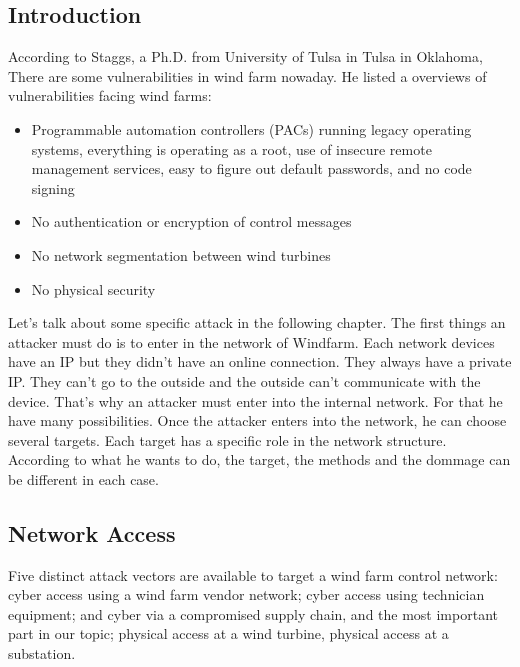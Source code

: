 \documentclass[twosided,a4,10pt]{article}
\begin{document}
\begin{multicols}{2}
\subsection{Introduction}
 According to Staggs, a Ph.D. from University of Tulsa in Tulsa in Oklahoma, There are some vulnerabilities in wind farm nowaday. He listed a overviews of vulnerabilities facing wind farms:
 \begin{itemize}
     \item Programmable automation controllers (PACs) running legacy operating systems, everything is operating as a root, use of insecure remote management services, easy to figure out default passwords, and no code signing
    \item	No authentication or encryption of control messages
    \item	No network segmentation between wind turbines
    \item	No physical security
 \end{itemize}
 Let's talk about some specific attack in the following chapter. The first things an attacker must do is to enter in the network of Windfarm. Each network devices have an IP but they didn't have an online connection. They always have a private IP. They can't go to the outside and the outside can't communicate with the device. That's why an attacker must enter into the internal network. For that he have many possibilities. Once the attacker enters into the network, he can choose several targets. Each target has a specific role in the network structure. According to what he wants to do, the target, the methods and the dommage can be different in each case.
 


\subsection{Network Access}
Five distinct attack vectors are available to target a wind farm control network: cyber access using a wind farm vendor network; cyber access using technician equipment; and cyber via a compromised supply chain, and the most important part in our topic; physical access at a wind turbine, physical access at a substation.

\end{multicols}
\end{document}
